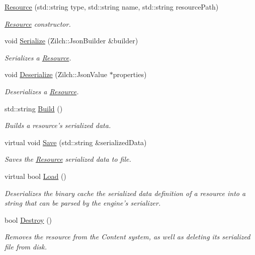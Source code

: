 \begin{DoxyCompactItemize}
\item 
\hyperlink{classDCEngine_1_1Resource_a356bff47df31f5b50b2f2e03bec84633}{Resource} (std\-::string type, std\-::string name, std\-::string resource\-Path)
\begin{DoxyCompactList}\small\item\em \hyperlink{classDCEngine_1_1Resource}{Resource} constructor. \end{DoxyCompactList}\item 
void \hyperlink{classDCEngine_1_1Resource_ac526446e7c78d54a68ec3860317c4777}{Serialize} (Zilch\-::\-Json\-Builder \&builder)
\begin{DoxyCompactList}\small\item\em Serializes a \hyperlink{classDCEngine_1_1Resource}{Resource}. \end{DoxyCompactList}\item 
void \hyperlink{classDCEngine_1_1Resource_ae1e6e6d4bf05bf0e910c645a0a41e068}{Deserialize} (Zilch\-::\-Json\-Value $\ast$properties)
\begin{DoxyCompactList}\small\item\em Deserializes a \hyperlink{classDCEngine_1_1Resource}{Resource}. \end{DoxyCompactList}\item 
std\-::string \hyperlink{classDCEngine_1_1Resource_ab683dd19451258a2ec4ce7147d2c738e}{Build} ()
\begin{DoxyCompactList}\small\item\em Builds a resource's serialized data. \end{DoxyCompactList}\item 
virtual void \hyperlink{classDCEngine_1_1Resource_a3136e195284064d3e21a903f16663d6f}{Save} (std\-::string \&serialized\-Data)
\begin{DoxyCompactList}\small\item\em Saves the \hyperlink{classDCEngine_1_1Resource}{Resource} serialized data to file. \end{DoxyCompactList}\item 
virtual bool \hyperlink{classDCEngine_1_1Resource_a99b06ae1da559efdc71edb528cac7caa}{Load} ()
\begin{DoxyCompactList}\small\item\em Deserializes the binary cache the serialized data definition of a resource into a string that can be parsed by the engine's serializer. \end{DoxyCompactList}\item 
bool \hyperlink{classDCEngine_1_1Resource_ad83db948d25c70d4bc335b7ebab53663}{Destroy} ()
\begin{DoxyCompactList}\small\item\em Removes the resource from the Content system, as well as deleting its serialized file from disk. \end{DoxyCompactList}\end{DoxyCompactItemize}
